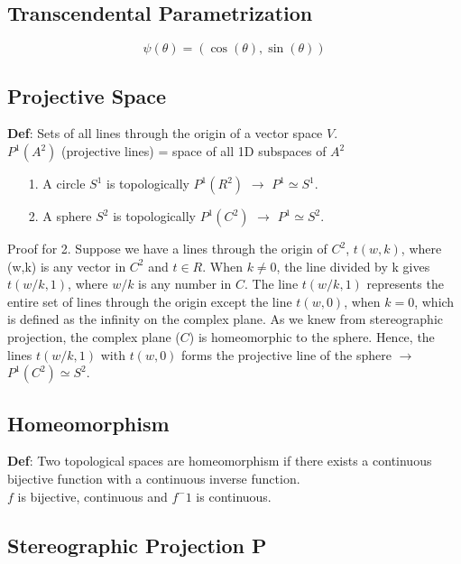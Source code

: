 \documentclass[12pt]{article}
\begin{document}
\subsection{Transcendental Parametrization}

\begin{equation}
   \psi(\theta) = (\cos(\theta), \sin(\theta))
\end{equation}

\subsection{Projective Space} 
{\bf Def}: Sets of all lines through the origin of a vector space $V$. \\

$P^1(A^2)$ (projective lines) = space of all 1D subspaces of $A^2$

\begin{itemize} 
   \item[1.] A circle $S^1$ is topologically $P^1(R^2)$ $\longrightarrow$ $P^1 \simeq S^1$.
   \item[2.] A sphere $S^2$ is topologically $P^1(C^2)$   $\longrightarrow$ $P^1 \simeq S^2$.
\end{itemize}
Proof for 2. 
Suppose we have a lines through the origin of $C^2$, $t(w,k)$, where (w,k) is any vector in $C^2$ and $t \in R$.
When $k \neq 0$, the line divided by k gives $t(w/k,1)$, where $w/k$ is any number in $C$. 
The line $t(w/k,1)$ represents the entire set of lines through the origin except the line $t(w,0)$, when $k=0$, which is defined as the infinity on the complex plane.
As we knew from stereographic projection, the complex plane ($C$) is homeomorphic to the sphere.
Hence, the lines $t(w/k,1)$ with $t(w,0)$ forms the projective line of the sphere $\longrightarrow$ $P^1(C^2) \simeq S^2$.

\subsection{Homeomorphism}

{\bf Def}: Two topological spaces are homeomorphism if there exists a continuous bijective function with a continuous inverse function. \\
$f$ is bijective, continuous and $f^-1$ is continuous.


\subsection{Stereographic Projection P}
\end{document}
